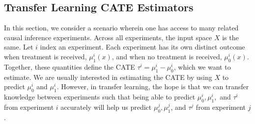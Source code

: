 \subsection{Transfer Learning CATE Estimators}






In this section, we consider a scenario wherein one has access to many related causal inference experiments. Across all experiments, the input space $X$ is the same. Let $i$ index an experiment. Each experiment has its own distinct outcome when treatment is received, $\mu^i_1(x)$, and when no treatment is received, $\mu^i_0(x)$. Together, these quantities define the CATE $\tau^i = \mu^i_1 - \mu^i_0$, which we want to estimate. We are usually interested in estimating the CATE by using $X$ to predict $\mu_0^i$ and $\mu_1^i$. However, in transfer learning, the hope is that we can transfer knowledge between experiments such that being able to predict $\mu_0^i, \mu_1^i,$ and $\tau^i$ from experiment $i$ accurately will help us predict $\mu_0^j, \mu_1^j$, and $\tau^j$ from experiment $j$. 

